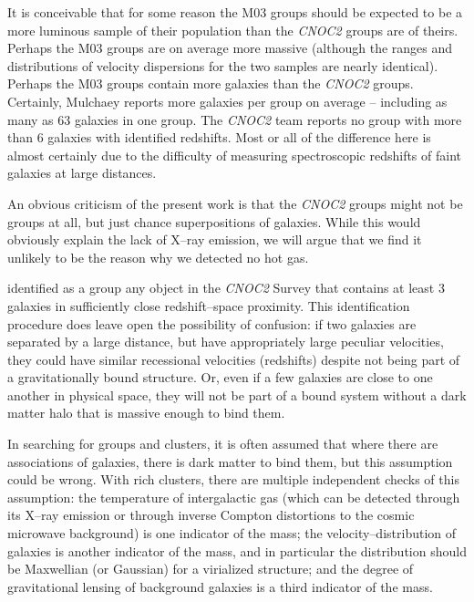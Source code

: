 \documentclass[12pt,preprint]{aastex}
\begin{document}
It is conceivable that for some reason the M03 groups should be expected to be
a more luminous sample of their population than the \textsl{CNOC2} groups
are of theirs.  Perhaps the M03 groups are on average more massive (although
the ranges and distributions of velocity dispersions for the two samples are
nearly identical).  Perhaps the M03 groups contain more galaxies than the
\textsl{CNOC2} groups.  Certainly, Mulchaey reports more galaxies per group
on average -- including as many as 63 galaxies in one group.  The
\textsl{CNOC2} team reports no group with more than 6 galaxies with identified
redshifts.  Most or all of the difference here is almost certainly due to
the difficulty of measuring spectroscopic redshifts of faint galaxies at large
distances.

An obvious criticism of the present work is that the \textsl{CNOC2} groups
might not be groups at all, but just chance superpositions of galaxies.
While this would obviously explain the lack of X--ray emission, we will argue
that we find it unlikely to be the reason why we detected no hot gas.

\citet{carlberg2001gg} identified as a group any object in the
\textsl{CNOC2} Survey that
contains at least 3 galaxies in sufficiently close redshift--space proximity.
This identification procedure does leave open the possibility of confusion:
if two galaxies are separated by a large distance, but have appropriately large
peculiar velocities, they could have similar recessional velocities (redshifts)
despite not being part of a gravitationally bound structure.  Or, even if a
few galaxies are close to one another in physical space, they will not be
part of a bound system without a dark matter halo that is massive 
enough to bind them.

In searching for groups and clusters, it is often assumed that where there
are associations of galaxies, there is dark matter to bind them, but this
assumption could be wrong.  With rich clusters, there are multiple independent
checks of this assumption: the temperature of intergalactic gas (which can be
detected through its X--ray emission or through inverse Compton distortions
to the cosmic microwave background) is one indicator of the mass; the
velocity--distribution of galaxies is another indicator of the mass, and
in particular the distribution should be Maxwellian (or Gaussian) for a
virialized structure;
and the degree of gravitational lensing of background galaxies is a third
indicator of the mass.
\end{document}
